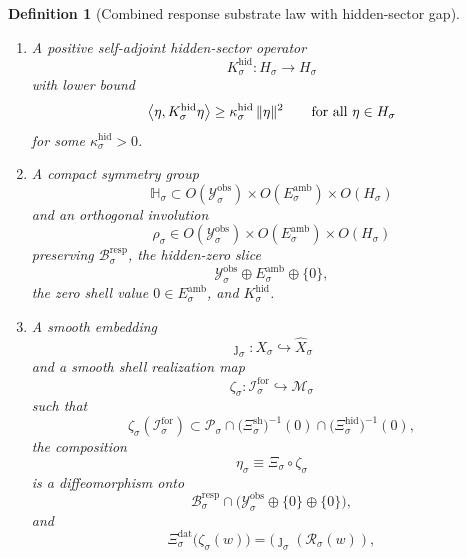 \documentclass[11pt]{article}
\newcommand{\ForSpace}[1]{\mathcal I_{#1}^{\mathrm{for}}}
\newcommand{\Reduction}[1]{\mathcal R_{#1}}
\newcommand{\VisibleAffine}[1]{\widehat X_{#1}}
\newcommand{\DataSpace}[1]{\mathcal Y_{#1}^{\mathrm{obs}}}
\newcommand{\HiddenOperator}[1]{K_{#1}^{\mathrm{hid}}}
\newcommand{\AmbientEmbed}[1]{\eta_{#1}}
\newcommand{\AmbientTarget}[1]{E_{#1}^{\mathrm{amb}}}
\newcommand{\ProtoSpace}[1]{\mathcal M_{#1}}
\newcommand{\ProtoBody}[1]{\mathcal P_{#1}}
\newcommand{\ResponseMap}[1]{\Xi_{#1}}
\newcommand{\ResponseData}[1]{\Xi_{#1}^{\mathrm{dat}}}
\newcommand{\ResponseShell}[1]{\Xi_{#1}^{\mathrm{sh}}}
\newcommand{\ResponseHidden}[1]{\Xi_{#1}^{\mathrm{hid}}}
\newcommand{\ResponseImage}[1]{\mathcal B_{#1}^{\mathrm{resp}}}
\newcommand{\GapSpace}[1]{H_{#1}}
\newcommand{\GapBody}[1]{D_{#1}}
\newcommand{\ResponseSym}[1]{\mathbb H_{#1}}
\newcommand{\ResponseTime}[1]{\rho_{#1}}
\newcommand{\ProtoEmbed}[1]{\zeta_{#1}}
\newtheorem{definition}{Definition}
\begin{document}
\begin{definition}[Combined response substrate law with hidden-sector gap]
\begin{enumerate}
\begin{equation}
    (u,e,n)\longmapsto \bigl((u,e,0),n\bigr)
    \label{eq:responsebijection}
    \end{equation}
    is a bijection from \(\ResponseImage{\sigma}\) onto
    \[
    \Bigl(
    \ResponseImage{\sigma}\cap
    \bigl(
    \DataSpace{\sigma}\oplus \AmbientTarget{\sigma}\oplus\{0\}
    \bigr)
    \Bigr)
    \times \GapBody{\sigma}.
    \]
    \item A positive self-adjoint hidden-sector operator
    \[
    \HiddenOperator{\sigma}:\GapSpace{\sigma}\to\GapSpace{\sigma}
    \]
    with lower bound
    \begin{equation}
    \ev{\eta,\HiddenOperator{\sigma}\eta}
    \ge
    \kappa_{\sigma}^{\mathrm{hid}}\,
    \|\eta\|^{2}
    \qquad
    \text{for all }\eta\in\GapSpace{\sigma}
    \label{eq:combinedgap}
    \end{equation}
    for some \(\kappa_{\sigma}^{\mathrm{hid}}>0\).
    \item A compact symmetry group
    \[
    \ResponseSym{\sigma}\subset
    O(\DataSpace{\sigma})\times O(\AmbientTarget{\sigma})\times O(\GapSpace{\sigma})
    \]
    and an orthogonal involution
    \[
    \ResponseTime{\sigma}\in
    O(\DataSpace{\sigma})\times O(\AmbientTarget{\sigma})\times O(\GapSpace{\sigma})
    \]
    preserving \(\ResponseImage{\sigma}\), the hidden-zero slice
    \[
    \DataSpace{\sigma}\oplus \AmbientTarget{\sigma}\oplus\{0\},
    \]
    the zero shell value \(0\in \AmbientTarget{\sigma}\), and \(\HiddenOperator{\sigma}\).
    \item A smooth embedding
    \[
    \jmath_{\sigma}:X_{\sigma}\hookrightarrow \VisibleAffine{\sigma}
    \]
    and a smooth shell realization map
    \[
    \ProtoEmbed{\sigma}:\ForSpace{\sigma}\hookrightarrow \ProtoSpace{\sigma}
    \]
    such that
    \[
    \ProtoEmbed{\sigma}(\ForSpace{\sigma})
    \subset
    \ProtoBody{\sigma}\cap
    \bigl(\ResponseShell{\sigma}\bigr)^{-1}(0)\cap
    \bigl(\ResponseHidden{\sigma}\bigr)^{-1}(0),
    \]
    the composition
    \begin{equation}
    \AmbientEmbed{\sigma}
    \equiv
    \ResponseMap{\sigma}\circ\ProtoEmbed{\sigma}
    \label{eq:ambientembeddef}
    \end{equation}
    is a diffeomorphism onto
    \[
    \ResponseImage{\sigma}\cap
    \bigl(
    \DataSpace{\sigma}\oplus\{0\}\oplus\{0\}
    \bigr),
    \]
    and
    \begin{equation}
    \ResponseData{\sigma}\bigl(\ProtoEmbed{\sigma}(w)\bigr)
    =
    \bigl(
    \jmath_{\sigma}(\Reduction{\sigma}(w)),

\end{equation}
\end{enumerate}
\end{definition}
\end{document}
